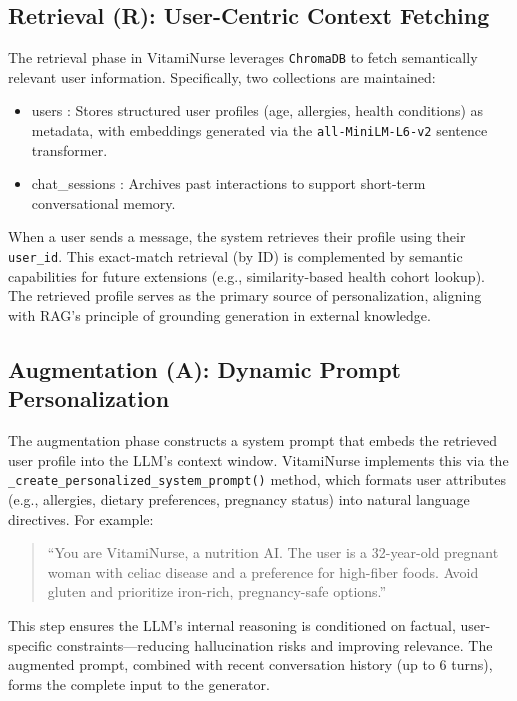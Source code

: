 \subsection{Retrieval (R): User-Centric Context Fetching}
\label{subsec:retrieval}

The retrieval phase in VitamiNurse leverages \texttt{ChromaDB} to fetch semantically relevant user information. Specifically, two collections are maintained:
\begin{itemize}[label=-]
\item users : Stores structured user profiles (age, allergies, health conditions) as metadata, with embeddings generated via the \texttt{all-MiniLM-L6-v2} sentence transformer.
\item chat\_sessions : Archives past interactions to support short-term conversational memory.
\end{itemize}


When a user sends a message, the system retrieves their profile using their \texttt{user\_id}. This exact-match retrieval (by ID) is complemented by semantic capabilities for future extensions (e.g., similarity-based health cohort lookup). The retrieved profile serves as the primary source of personalization, aligning with RAG’s principle of grounding generation in external knowledge\cite{rag2020}.

\subsection{Augmentation (A): Dynamic Prompt Personalization}
\label{subsec:augmentation}

The augmentation phase constructs a system prompt that embeds the retrieved user profile into the LLM’s context window. VitamiNurse implements this via the \texttt{\_create\_personalized\_system\_prompt()} method, which formats user attributes (e.g., allergies, dietary preferences, pregnancy status) into natural language directives. For example:

\begin{quote}
    ``You are VitamiNurse, a nutrition AI. The user is a 32-year-old pregnant woman with celiac disease and a preference for high-fiber foods. Avoid gluten and prioritize iron-rich, pregnancy-safe options.''
\end{quote}

This step ensures the LLM’s internal reasoning is conditioned on factual, user-specific constraints—reducing hallucination risks and improving relevance. The augmented prompt, combined with recent conversation history (up to 6 turns), forms the complete input to the generator.

